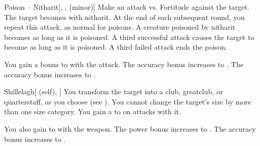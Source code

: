 \lowercase{\hypertarget{spell:Poison -- Nitharit}{}}\label{spell:Poison -- Nitharit}
\begin{freeability}[Rank 1]{\hypertarget{spell:Poison -- Nitharit}{Poison -- Nitharit}}[, ,  (minor)]
Make an attack vs. Fortitude against the target.
\hit The target becomes  with nitharit.
At the end of each subsequent round, you repeat this attack, as normal for poisons.
A creature poisoned by nitharit becomes  as long as it is poisoned.
A third successful attack causes the target to become  as long as it is poisoned.
A third failed attack ends the poison.

\rankline
{} You gain a  bonus to  with the attack.
 The accuracy bonus increases to .
 The accuracy bonus increases to .

\end{freeability}
\vspace{0.25em}



\lowercase{\hypertarget{spell:Shillelagh}{}}\label{spell:Shillelagh}
\begin{attuneability}[Rank 1]{\hypertarget{spell:Shillelagh}{Shillelagh}}[ (self), ]
You transform the target into a club, greatclub, or quarterstaff, as you choose (see ).
You cannot change the target's size by more than one size category.
You gain a   to  on attacks with it.

\rankline
{} You also gain   to  with the weapon.
 The power bonus increases to .
 The accuracy bonus increases to .

\end{attuneability}
\vspace{0.25em}




